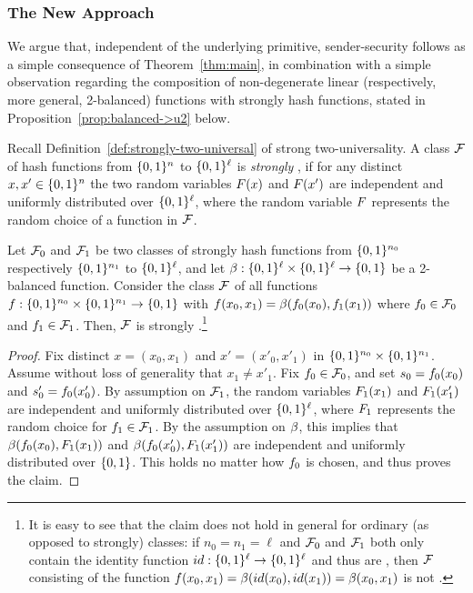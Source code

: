 \subsubsection{The New Approach}

We argue that, independent of the underlying primitive,
sender-security follows as a simple consequence of
Theorem~\ref{thm:main}, in combination with a simple observation
regarding the composition of non-degenerate linear (respectively, more general,
2-balanced) functions with strongly \univ
hash functions, stated in Proposition~\ref{prop:balanced->u2} below.

Recall Definition~\ref{def:strongly-two-universal} of strong
two-universality.  A class ${\cal F}$ of hash functions from $\{0,1\}^n$
to $\{0,1\}^{\ell}$ is {\em strongly \univ}, if for any
distinct $x,x' \in \{0,1\}^n$ the two random variables $F(x)$ and
$F(x')$ are independent and uniformly distributed over
$\{0,1\}^{\ell}$, where the random variable $F$ represents the
random choice of a function in ${\cal F}$.
\begin{proposition}\label{prop:balanced->u2}
  Let ${\cal F}_0$ and ${\cal F}_1$ be two classes of strongly \univ hash
  functions from $\{0,1\}^{n_0}$ respectively $\{0,1\}^{n_1}$ to
  $\{0,1\}^{\ell}$, and let
  $\beta:\{0,1\}^{\ell}\times\{0,1\}^{\ell}\rightarrow\{0,1\}$ be
  a 2-balanced function. Consider the class ${\cal F}$ of all functions
  $f:\{0,1\}^{n_0}\times\{0,1\}^{n_1}\rightarrow\{0,1\}$ with
  $f(x_0,x_1) = \beta(f_0(x_0),f_1(x_1))$ where $f_0\in {\cal F}_0$
  and $f_1 \in {\cal F}_1$. Then, ${\cal F}$ is strongly \univ.\footnote{It is
    easy to see that the claim does not hold in general for ordinary
    (as opposed to strongly) \univ classes: if $n_0 = n_1 = \ell$ and
    ${\cal F}_0$ and ${\cal F}_1$ both only contain the identity function
    $id:\{0,1\}^{\ell}\rightarrow\{0,1\}^{\ell}$ and thus are
    \univ, then ${\cal F}$ consisting of the function $f(x_0,x_1) =
    \beta(id(x_0),id(x_1)) = \beta(x_0,x_1)$ is not \univ. }
\end{proposition} 
\begin{proof}
  Fix distinct $x = (x_0,x_1)$ and $x' = (x'_0,x'_1)$ in
  $\{0,1\}^{n_0}\times\{0,1\}^{n_1}$. Assume without loss of
  generality that $x_1 \neq x'_1$. Fix $f_0 \in {\cal F}_0$, and set $s_0
  = f_0(x_0)$ and $s'_0 = f_0(x'_0)$. By assumption on ${\cal F}_1$,
  the random variables $F_1(x_1)$ and $F_1(x'_1)$ are independent and
  uniformly distributed over $\{0,1\}^{\ell}$, where $F_1$
  represents the random choice for $f_1 \in {\cal F}_1$. By the
  assumption on $\beta$, this implies that
  $\beta(f_0(x_0),F_1(x_1))$ and $\beta(f_0(x'_0),F_1(x'_1))$
  are independent and uniformly distributed over $\{0,1\}$. This holds
  no matter how $f_0$ is chosen, and thus proves the claim.
\end{proof}

